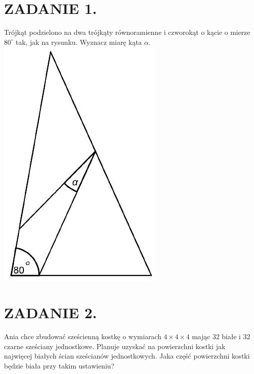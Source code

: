 \documentclass[10pt]{article}
\begin{document}
\section*{ZADANIE 1.}
Trójkąt podzielono na dwa trójkąty równoramienne i czworokąt o kącie o mierze \(80^{\circ}\) tak, jak na rysunku. Wyznacz miarę kąta \(\alpha\).\\
\includegraphics[max width=\textwidth, center]{2024_11_21_7f0a65778be44e58ebeag-1(1)}

\section*{ZADANIE 2.}
Ania chce zbudować sześcienną kostkę o wymiarach \(4 \times 4 \times 4\) mając 32 białe i 32 czarne sześciany jednostkowe. Planuje uzyskać na powierzchni kostki jak najwięcej białych ścian sześcianów jednostkowych. Jaka część powierzchni kostki będzie biała przy takim ustawieniu?
\end{document}

